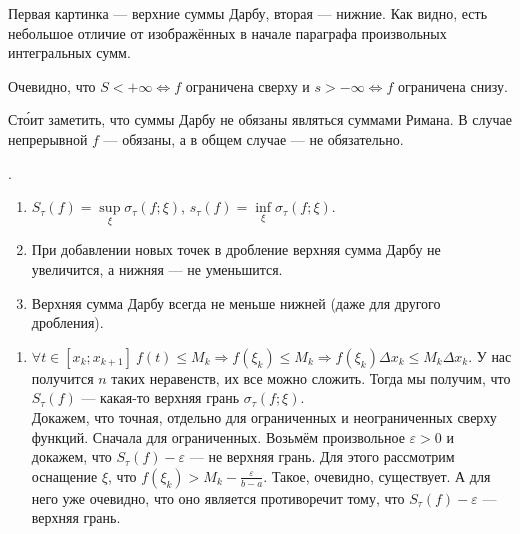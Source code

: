 \documentclass{article}
\begin{document}
\begin{itemize}
\begin{Comment}
\begin{center}
            \end{center}
            Первая картинка --- верхние суммы Дарбу, вторая --- нижние. Как видно, есть небольшое отличие от изображённых в начале параграфа произвольных интегральных сумм.
        \end{Comment}
        \thm Очевидно, что $S<+\infty\Leftrightarrow f\text{ ограничена сверху}$ и $s>-\infty\Leftrightarrow f\text{ ограничена снизу}$.
        \begin{Comment}
            Ст\'{о}ит заметить, что суммы Дарбу не обязаны являться суммами Римана. В случае непрерывной $f$ --- обязаны, а в общем случае --- не обязательно.
        \end{Comment}
        \thm {}.
        \begin{enumerate}
            \item $S_\tau(f)=\sup\limits_\xi\sigma_\tau(f;\xi)$, $s_\tau(f)=\inf\limits_\xi\sigma_\tau(f;\xi)$.
            \item При добавлении новых точек в дробление верхняя сумма Дарбу не увеличится, а нижняя --- не уменьшится.
            \item Верхняя сумма Дарбу всегда не меньше нижней (даже для другого дробления).
        \end{enumerate}
        \begin{Proof}
            \begin{enumerate}
                \item
                $\forall t\in[x_k;x_{k+1}]~f(t)\leqslant M_k\Rightarrow f(\xi_k)\leqslant M_k\Rightarrow f(\xi_k)\Delta x_k\leqslant M_k\Delta x_k$. У нас получится $n$ таких неравенств, их все можно сложить. Тогда мы получим, что $S_\tau(f)$ --- какая-то верхняя грань $\sigma_\tau(f;\xi)$.\\
                Докажем, что точная, отдельно для ограниченных и неограниченных сверху функций. Сначала для ограниченных. Возьмём произвольное $\varepsilon>0$ и докажем, что $S_\tau(f)-\varepsilon$ --- не верхняя грань. Для этого рассмотрим оснащение $\xi$, что $f(\xi_k)>M_k-\frac\varepsilon{b-a}$. Такое, очевидно, существует. А для него уже очевидно, что оно является противоречит тому, что $S_\tau(f)-\varepsilon$ --- верхняя грань.\\

\end{enumerate}
\end{Proof}
\end{itemize}
\end{document}
